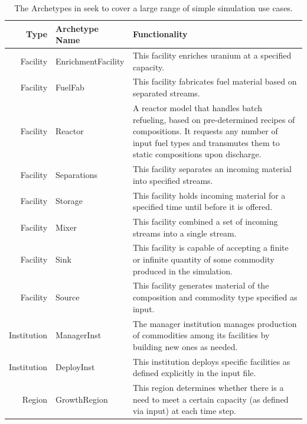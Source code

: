 \begin{table}[ht]
\centering
\caption[The Archetypes in \Cycamore seek to cover a large range of simple
simulation use cases.]{The Archetypes in \Cycamore seek to cover a large range of simple
simulation use cases.}
\label{tab:cycamore}
\begin{tabularx}{\textwidth}{rlX}
\hline
\textbf{Type} & \textbf{Archetype Name} & \textbf{Functionality} \\
\hline
Facility & EnrichmentFacility & This facility enriches uranium at a specified capacity. \\
Facility & FuelFab & This facility fabricates fuel material based on separated streams. \\
Facility & Reactor & A reactor model that handles batch refueling, based on pre-determined recipes of compositions. It requests any number of input fuel types and transmutes them to static compositions upon discharge.\\
Facility & Separations & This facility separates an incoming material into specified streams. \\
Facility & Storage & This facility holds incoming material for a specified time until before it is offered. \\
Facility & Mixer & This facility combined a set of incoming streams into a single stream. \\
Facility & Sink & This facility is capable of accepting a finite or infinite quantity of some commodity produced in the simulation. \\
Facility & Source & This facility generates material of the composition and commodity type specified as input.  \\
Institution & ManagerInst & The manager institution manages production of commodities among its facilities by building new ones as needed. \\
Institution & DeployInst &  This institution deploys specific facilities as defined explicitly in the input file. \\
Region & GrowthRegion & This region determines whether there is a need to meet a certain capacity (as defined via input) at each time step. \\
\hline
\end{tabularx}
\end{table}

